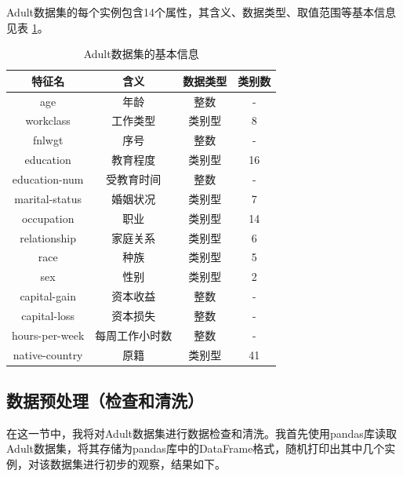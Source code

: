 \documentclass[12pt,a4paper]{article}
\theoremstyle{definition}
\begin{document}
\vspace{-0.01\linewidth}
Adult数据集的每个实例包含14个属性，其含义、数据类型、取值范围等基本信息见表 \ref{tab:feature-info}。

\begin{table}[H]
	\renewcommand\arraystretch{1.15}
	\caption{Adult数据集的基本信息}
	\label{tab:feature-info}
	\centering
	
	\begin{tabular}{c|c|c|c}
		\centering
		 特征名 & 含义 & 数据类型 & 类别数 \\
		\hline
		\hline
		age & 年龄 & 整数 & - \\
		workclass & 工作类型 & 类别型 & 8 \\
		fnlwgt & 序号 & 整数 & - \\
		education & 教育程度 & 类别型 & 16 \\
		education-num & 受教育时间 & 整数 & - \\
		marital-status & 婚姻状况 & 类别型 & 7 \\
		occupation & 职业 & 类别型 & 14 \\
		relationship & 家庭关系 & 类别型 & 6 \\
		race & 种族 & 类别型 & 5 \\
		sex & 性别 & 类别型 & 2 \\
		capital-gain & 资本收益 & 整数 & - \\
		capital-loss & 	资本损失 & 整数 & - \\
		hours-per-week & 每周工作小时数 & 整数 & - \\
		native-country & 原籍 & 类别型 & 41 \\
		
	\end{tabular}
\end{table}

\subsection{数据预处理（检查和清洗）}

\vspace{0.01\linewidth}
在这一节中，我将对Adult数据集进行数据检查和清洗。我首先使用pandas库读取Adult数据集，将其存储为pandas库中的DataFrame格式，随机打印出其中几个实例，对该数据集进行初步的观察，结果如下。
\end{document}
